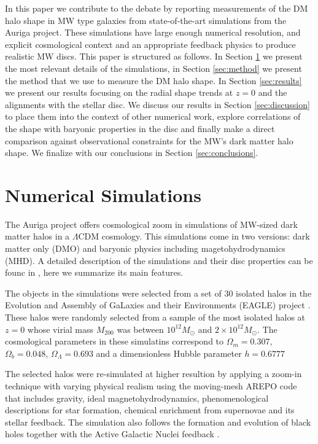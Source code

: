 \documentclass[usenatbib]{mnras}
\begin{document}
In this paper we contribute to the debate by reporting measurements of
the DM halo shape in MW type galaxies from state-of-the-art simulations from the
Auriga project.
These simulations have large enough numerical resolution, and explicit
cosmological context and an appropriate feedback physics to produce
realistic MW discs.
This paper is structured as follows. 
In Section \ref{sec:numerical} we present the most relevant details of
the simulations, in Section \ref{sec:method} we present the method
that we use to measure the DM halo shape. 
In Section \ref{sec:results} we present our results focusing on the
radial shape trends at $z=0$ and the alignments with the stellar disc.
We discuss our results in Section \ref{sec:discussion} to place them
into the context of other numerical work, explore correlations of the
shape with baryonic properties in the disc and finally make a direct
comparison against observational constraints for the MW's dark matter halo shape.
We finalize with our conclusions in Section \ref{sec:conclusions}.


\section{Numerical Simulations}
\label{sec:numerical}

The Auriga project offers cosmological zoom in simulations of MW-sized 
dark matter halos in a $\Lambda$CDM cosmology. 
This simulations come in two versions: dark matter only (DMO) and
baryonic physics including magetohydrodynamics (MHD).
A detailed description of the simulations and their disc properties
can be founc in \citep{auriga}, here we summarize its main features.

The objects in the simulations were selected from a set of 30
isolated halos in the Evolution and Assembly of GaLaxies and their
Environments (EAGLE)  project \citep{Eagle}.   
These halos were randomly selected from a sample of the most isolated
halos at $z=0$ whose virial mass $M_{200}$ was between $10^{12}M_\odot$ and
$2\times 10^{12}M_\odot$. 
The cosmological parameters in these simulatins correspond to
$\Omega_m=0.307$, $\Omega_b=0.048$, $\Omega_\Lambda=0.693$ and a
dimensionless Hubble parameter $h=0.6777$ \citep{2014A&A...571A..16P}

The selected halos were re-simulated at higher resultion by applying a
zoom-in technique with varying physical realism using the moving-mesh AREPO code
that includes gravity, ideal magnetohydrodynamics,  phenomenological
descriptions for star formation, chemical enrichment from supernovae
and its stellar feedback.   
The simulation also follows the formation and evolution of black holes
together with the Active Galactic Nuclei feedback
\citep{arepo,2013MNRAS.432..176P}. 
\end{document}

